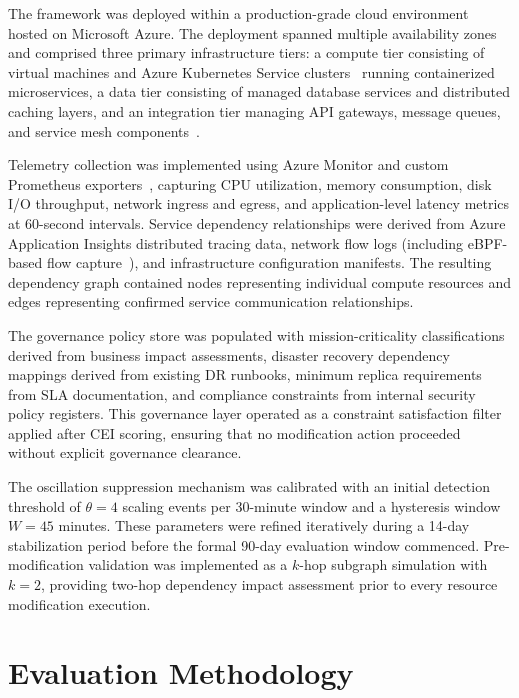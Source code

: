 \documentclass[runningheads]{llncs}
\begin{document}
The framework was deployed within a production-grade cloud environment hosted on Microsoft Azure. The deployment spanned multiple availability zones and comprised three primary infrastructure tiers: a compute tier consisting of virtual machines and Azure Kubernetes Service clusters~\cite{burns_borg,verma_kubernetes} running containerized microservices, a data tier consisting of managed database services and distributed caching layers, and an integration tier managing API gateways, message queues, and service mesh components~\cite{istio_servicemesh}.

Telemetry collection was implemented using Azure Monitor and custom Prometheus exporters~\cite{prometheus_observability,open_telemetry}, capturing CPU utilization, memory consumption, disk I/O throughput, network ingress and egress, and application-level latency metrics at 60-second intervals. Service dependency relationships were derived from Azure Application Insights distributed tracing data, network flow logs (including eBPF-based flow capture~\cite{kong_cilium}), and infrastructure configuration manifests. The resulting dependency graph contained nodes representing individual compute resources and edges representing confirmed service communication relationships.

The governance policy store was populated with mission-criticality classifications derived from business impact assessments, disaster recovery dependency mappings derived from existing DR runbooks, minimum replica requirements from SLA documentation, and compliance constraints from internal security policy registers. This governance layer operated as a constraint satisfaction filter applied after CEI scoring, ensuring that no modification action proceeded without explicit governance clearance.

The oscillation suppression mechanism was calibrated with an initial detection threshold of $\theta = 4$ scaling events per 30-minute window and a hysteresis window $W = 45$ minutes. These parameters were refined iteratively during a 14-day stabilization period before the formal 90-day evaluation window commenced. Pre-modification validation was implemented as a $k$-hop subgraph simulation with $k = 2$, providing two-hop dependency impact assessment prior to every resource modification execution.

\section{Evaluation Methodology}
\label{sec:methodology}
\end{document}
